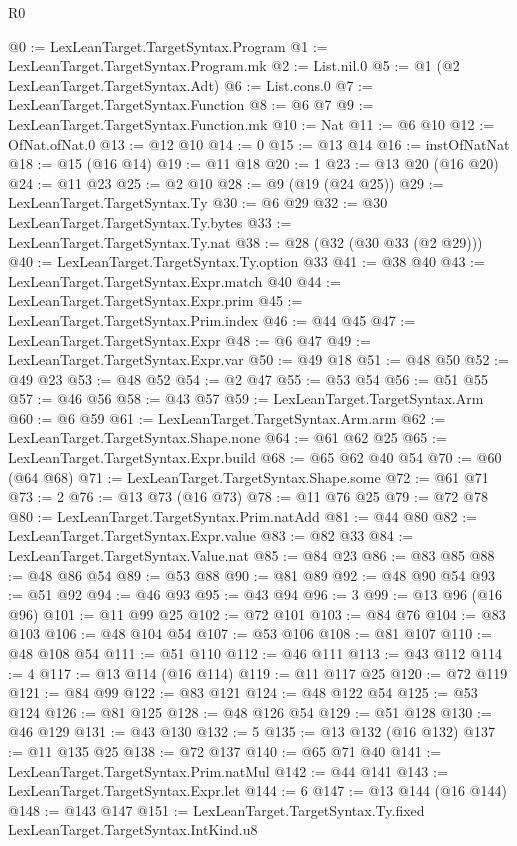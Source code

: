 \begin{lexlean}{R0}
\begin{coremodule}
@0 := LexLeanTarget.TargetSyntax.Program
@1 := LexLeanTarget.TargetSyntax.Program.mk
@2 := List.nil.{0}
@5 := @1 (@2 LexLeanTarget.TargetSyntax.Adt)
@6 := List.cons.{0}
@7 := LexLeanTarget.TargetSyntax.Function
@8 := @6 @7
@9 := LexLeanTarget.TargetSyntax.Function.mk
@10 := Nat
@11 := @6 @10
@12 := OfNat.ofNat.{0}
@13 := @12 @10
@14 := 0
@15 := @13 @14
@16 := instOfNatNat
@18 := @15 (@16 @14)
@19 := @11 @18
@20 := 1
@23 := @13 @20 (@16 @20)
@24 := @11 @23
@25 := @2 @10
@28 := @9 (@19 (@24 @25))
@29 := LexLeanTarget.TargetSyntax.Ty
@30 := @6 @29
@32 := @30 LexLeanTarget.TargetSyntax.Ty.bytes
@33 := LexLeanTarget.TargetSyntax.Ty.nat
@38 := @28 (@32 (@30 @33 (@2 @29)))
@40 := LexLeanTarget.TargetSyntax.Ty.option @33
@41 := @38 @40
@43 := LexLeanTarget.TargetSyntax.Expr.match @40
@44 := LexLeanTarget.TargetSyntax.Expr.prim
@45 := LexLeanTarget.TargetSyntax.Prim.index
@46 := @44 @45
@47 := LexLeanTarget.TargetSyntax.Expr
@48 := @6 @47
@49 := LexLeanTarget.TargetSyntax.Expr.var
@50 := @49 @18
@51 := @48 @50
@52 := @49 @23
@53 := @48 @52
@54 := @2 @47
@55 := @53 @54
@56 := @51 @55
@57 := @46 @56
@58 := @43 @57
@59 := LexLeanTarget.TargetSyntax.Arm
@60 := @6 @59
@61 := LexLeanTarget.TargetSyntax.Arm.arm
@62 := LexLeanTarget.TargetSyntax.Shape.none
@64 := @61 @62 @25
@65 := LexLeanTarget.TargetSyntax.Expr.build
@68 := @65 @62 @40 @54
@70 := @60 (@64 @68)
@71 := LexLeanTarget.TargetSyntax.Shape.some
@72 := @61 @71
@73 := 2
@76 := @13 @73 (@16 @73)
@78 := @11 @76 @25
@79 := @72 @78
@80 := LexLeanTarget.TargetSyntax.Prim.natAdd
@81 := @44 @80
@82 := LexLeanTarget.TargetSyntax.Expr.value
@83 := @82 @33
@84 := LexLeanTarget.TargetSyntax.Value.nat
@85 := @84 @23
@86 := @83 @85
@88 := @48 @86 @54
@89 := @53 @88
@90 := @81 @89
@92 := @48 @90 @54
@93 := @51 @92
@94 := @46 @93
@95 := @43 @94
@96 := 3
@99 := @13 @96 (@16 @96)
@101 := @11 @99 @25
@102 := @72 @101
@103 := @84 @76
@104 := @83 @103
@106 := @48 @104 @54
@107 := @53 @106
@108 := @81 @107
@110 := @48 @108 @54
@111 := @51 @110
@112 := @46 @111
@113 := @43 @112
@114 := 4
@117 := @13 @114 (@16 @114)
@119 := @11 @117 @25
@120 := @72 @119
@121 := @84 @99
@122 := @83 @121
@124 := @48 @122 @54
@125 := @53 @124
@126 := @81 @125
@128 := @48 @126 @54
@129 := @51 @128
@130 := @46 @129
@131 := @43 @130
@132 := 5
@135 := @13 @132 (@16 @132)
@137 := @11 @135 @25
@138 := @72 @137
@140 := @65 @71 @40
@141 := LexLeanTarget.TargetSyntax.Prim.natMul
@142 := @44 @141
@143 := LexLeanTarget.TargetSyntax.Expr.let
@144 := 6
@147 := @13 @144 (@16 @144)
@148 := @143 @147
@151 := LexLeanTarget.TargetSyntax.Ty.fixed LexLeanTarget.TargetSyntax.IntKind.u8

\end{coremodule}
\end{lexlean}
